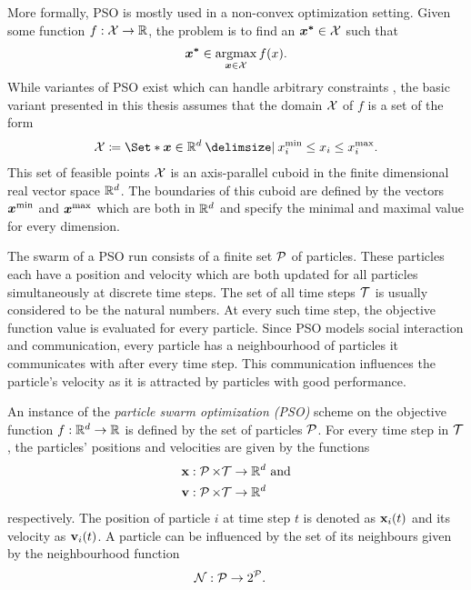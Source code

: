 More formally, PSO is mostly used in a non-convex optimization setting.
Given some function $f : \operatorname{\mathcal{X}} \to \mathbb{R}$, the problem is to find an $\bm{x^\ast} \in \operatorname{\mathcal{X}}$ such that
\begin{align}
    \bm{x^\ast} \in \operatorname*{argmax}_{\bm{x} \in \operatorname{\mathcal{X}}} f(x).
\end{align}
While variantes of PSO exist which can handle arbitrary constraints \cite{engelbrecht_fundamentals_2006}, the basic variant presented in this thesis assumes that the domain $\operatorname{\mathcal{X}}$ of $f$ is a set of the form
\begin{align}
    \X \coloneqq \Set*{\mat{x} \in \R^d \with x^{\text{min}}_i \leq x_i \leq x^{\text{max}}_i}.
\end{align}
This set of feasible points $\operatorname{\mathcal{X}}$ is an axis-parallel cuboid in the finite dimensional real vector space $\mathbb{R}^d$.
The boundaries of this cuboid are defined by the vectors $\bm{x^{\text{min}}}$ and $\bm{x^{\text{max}}}$ which are both in $\mathbb{R}^d$ and specify the minimal and maximal value for every dimension.

The swarm of a PSO run consists of a finite set $\operatorname{\mathcal{P}}$ of particles.
These particles each have a position and velocity which are both updated for all particles simultaneously at discrete time steps.
The set of all time steps $\mathcal{T}$ is usually considered to be the natural numbers.
At every such time step, the objective function value is evaluated for every particle.
Since PSO models social interaction and communication, every particle has a neighbourhood of particles it communicates with after every time step.
This communication influences the particle's velocity as it is attracted by particles with good performance.
\begin{definition}
    An instance of the \emph{particle swarm optimization (PSO)} scheme on the objective function $f : \mathbb{R}^d \to \mathbb{R}$ is defined by the set of particles $\operatorname{\mathcal{P}}$.
    For every time step in $\mathcal{T}$, the particles' positions and velocities are given by the functions
    \begin{align}
        \operatorname{\mathbf{x}} &: \operatorname{\mathcal{P}} \times \mathcal{T} \to \mathbb{R}^d \text{ and} \\
        \operatorname{\mathbf{v}} &: \operatorname{\mathcal{P}} \times \mathcal{T} \to \mathbb{R}^d
    \end{align}
    respectively. The position of particle $i$ at time step $t$ is denoted as $\operatorname{\mathbf{x}}_i(t)$ and its velocity as $\operatorname{\mathbf{v}}_i(t)$. A particle can be influenced by the set of its neighbours given by the neighbourhood function
    \begin{align}
        \operatorname{\mathcal{N}} &: \operatorname{\mathcal{P}} \to 2^{\operatorname{\mathcal{P}}}.
    \end{align}
\end{definition}

